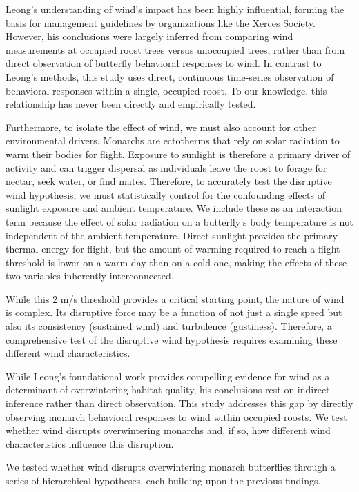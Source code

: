Leong's understanding of wind's impact has been highly influential, forming the basis for management guidelines by organizations like the Xerces Society. However, his conclusions were largely inferred from comparing wind measurements at occupied roost trees versus unoccupied trees, rather than from direct observation of butterfly behavioral responses to wind. In contrast to Leong's methods, this study uses direct, continuous time-series observation of behavioral responses within a single, occupied roost. To our knowledge, this relationship has never been directly and empirically tested.

Furthermore, to isolate the effect of wind, we must also account for other environmental drivers. Monarchs are ectotherms that rely on solar radiation to warm their bodies for flight. Exposure to sunlight is therefore a primary driver of activity and can trigger dispersal as individuals leave the roost to forage for nectar, seek water, or find mates. Therefore, to accurately test the disruptive wind hypothesis, we must statistically control for the confounding effects of sunlight exposure and ambient temperature. We include these as an interaction term because the effect of solar radiation on a butterfly's body temperature is not independent of the ambient temperature. Direct sunlight provides the primary thermal energy for flight, but the amount of warming required to reach a flight threshold is lower on a warm day than on a cold one, making the effects of these two variables inherently interconnected.

While this 2 m/s threshold provides a critical starting point, the nature of wind is complex. Its disruptive force may be a function of not just a single speed but also its consistency (sustained wind) and turbulence (gustiness). Therefore, a comprehensive test of the disruptive wind hypothesis requires examining these different wind characteristics.

While Leong's foundational work provides compelling evidence for wind as a determinant of overwintering habitat quality, his conclusions rest on indirect inference rather than direct observation. This study addresses this gap by directly observing monarch behavioral responses to wind within occupied roosts. We test whether wind disrupts overwintering monarchs and, if so, how different wind characteristics influence this disruption.

We tested whether wind disrupts overwintering monarch butterflies through a series of hierarchical hypotheses, each building upon the previous findings.

